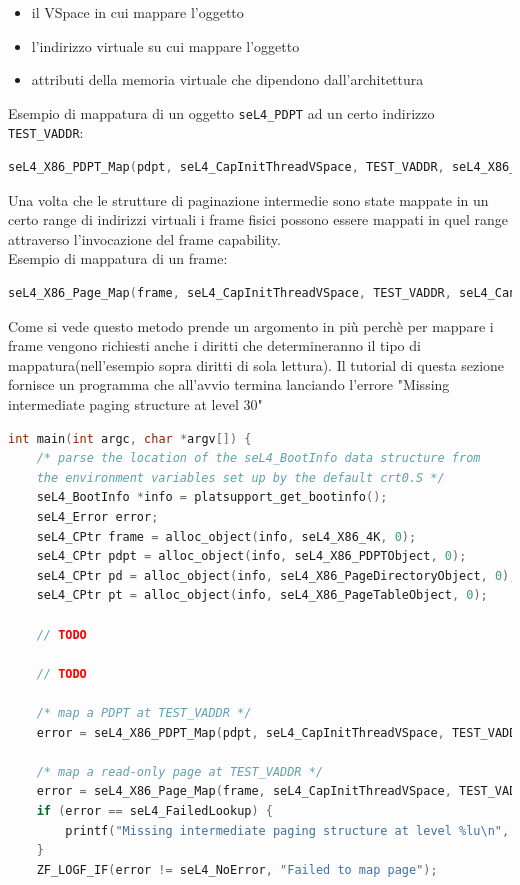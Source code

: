 \begin{itemize}
	\item il VSpace in cui mappare l'oggetto
	\item l'indirizzo virtuale su cui mappare l'oggetto
	\item attributi della memoria virtuale che dipendono dall'architettura 
\end{itemize}
Esempio di mappatura di un oggetto \texttt{seL4\_PDPT} ad un certo indirizzo \texttt{TEST\_VADDR}:
\begin{lstlisting}[language=C++]
seL4_X86_PDPT_Map(pdpt, seL4_CapInitThreadVSpace, TEST_VADDR, seL4_X86_Default_VMAttributes);
\end{lstlisting}
Una volta che le strutture di paginazione intermedie sono state mappate in un certo range di indirizzi virtuali i frame fisici possono essere mappati in quel range attraverso l'invocazione del frame capability.\\
Esempio di mappatura di un frame:
\begin{lstlisting}[language=C++]
seL4_X86_Page_Map(frame, seL4_CapInitThreadVSpace, TEST_VADDR, seL4_CanRead, seL4_X86_Default_VMAttributes);
\end{lstlisting}
Come si vede questo metodo prende un argomento in più perchè per mappare i frame vengono richiesti anche i diritti che determineranno il tipo di mappatura(nell'esempio sopra diritti di sola lettura).
Il tutorial di questa sezione fornisce un programma che all'avvio termina lanciando l'errore "Missing intermediate paging structure at level 30" 
\begin{lstlisting}[language=C++]
int main(int argc, char *argv[]) {
    /* parse the location of the seL4_BootInfo data structure from
    the environment variables set up by the default crt0.S */
    seL4_BootInfo *info = platsupport_get_bootinfo();
    seL4_Error error;
    seL4_CPtr frame = alloc_object(info, seL4_X86_4K, 0);
    seL4_CPtr pdpt = alloc_object(info, seL4_X86_PDPTObject, 0);
    seL4_CPtr pd = alloc_object(info, seL4_X86_PageDirectoryObject, 0);
    seL4_CPtr pt = alloc_object(info, seL4_X86_PageTableObject, 0);

	// TODO
	
	// TODO

    /* map a PDPT at TEST_VADDR */
    error = seL4_X86_PDPT_Map(pdpt, seL4_CapInitThreadVSpace, TEST_VADDR, seL4_X86_Default_VMAttributes);

    /* map a read-only page at TEST_VADDR */
    error = seL4_X86_Page_Map(frame, seL4_CapInitThreadVSpace, TEST_VADDR, seL4_CanRead, seL4_X86_Default_VMAttributes);
    if (error == seL4_FailedLookup) {
        printf("Missing intermediate paging structure at level %lu\n", seL4_MappingFailedLookupLevel());
    }
    ZF_LOGF_IF(error != seL4_NoError, "Failed to map page");
\end{lstlisting}

